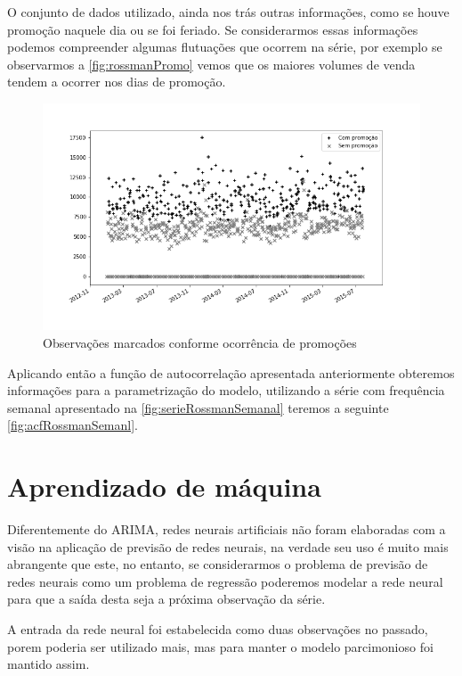 \documentclass[
    12pt,
    oneside,
    a4paper,
    english,
    brazil
]{abntex2}
\begin{document}
O conjunto de dados utilizado, ainda nos trás outras informações, como se houve 
promoção naquele dia ou se foi feriado. Se considerarmos essas informações 
podemos compreender algumas flutuações que ocorrem na série, por exemplo se 
observarmos a \autoref{fig:rossmanPromo} vemos que os maiores volumes de venda 
tendem a ocorrer nos dias de promoção.

\begin{figure}
    \centering
    \caption{Observações marcados conforme ocorrência de promoções}
    \includegraphics[width=.7\textwidth]{images/graficoRossmanPromo.png}
\end{figure}

Aplicando então a função de autocorrelação apresentada anteriormente obteremos 
informações para a parametrização do modelo, utilizando a série com frequência 
semanal apresentado na \autoref{fig:serieRossmanSemanal} teremos a seguinte 
\autoref{fig:acfRossmanSemanl}.


\section{Aprendizado de máquina}

Diferentemente do ARIMA, redes neurais artificiais não foram elaboradas com a 
visão na aplicação de previsão de redes neurais, na verdade seu uso é muito mais 
abrangente que este, no entanto, se considerarmos o problema de previsão de 
redes neurais como um problema de regressão poderemos modelar a rede neural para 
que a saída desta seja a próxima observação da série.

A entrada da rede neural foi estabelecida como duas observações no passado, 
porem poderia ser utilizado mais, mas para manter o modelo parcimonioso foi 
mantido assim.
\end{document}
